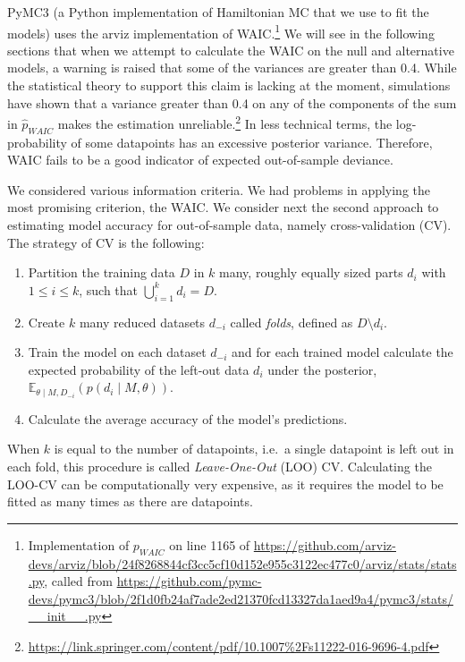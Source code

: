 \documentclass[a4paper,12pt,twoside]{article}
\begin{document}
PyMC3 (a Python implementation of Hamiltonian MC that we use to fit the models) uses the arviz implementation of WAIC.\footnote{Implementation of $p_{WAIC}$ on line 1165 of \url{https://github.com/arviz-devs/arviz/blob/24f8268844cf3cc5cf10d152e955c3122ec477c0/arviz/stats/stats.py}, called from \url{https://github.com/pymc-devs/pymc3/blob/2f1d0fb24af7ade2ed21370fcd13327da1aed9a4/pymc3/stats/__init__.py}} We will see in the following sections that when we attempt to calculate the WAIC on the null and alternative models, a warning is raised that some of the variances are greater than 0.4. While the statistical theory to support this claim is lacking at the moment, simulations have shown that a variance greater than 0.4 on any of the components of the sum in $\hat{p}_{WAIC}$ makes the estimation unreliable.\footnote{\url{https://link.springer.com/content/pdf/10.1007\%2Fs11222-016-9696-4.pdf}} In less technical terms, the log-probability of some datapoints has an excessive posterior variance. Therefore, WAIC fails to be a good indicator of expected out-of-sample deviance.

We considered various information criteria. We had problems in applying the most promising criterion, the WAIC. We consider next the second approach to estimating model accuracy for out-of-sample data, namely cross-validation (CV). The strategy of CV is the following:
\begin{enumerate}
\item Partition the training data $D$ in $k$ many, roughly equally sized parts $ d_i $ with $1 \leq i \leq k$, such that $\bigcup_{i=1}^{k} d_i = D$.
\item Create $k$ many reduced datasets $d_{-i}$ called \textit{folds}, defined as $D \setminus d_i$.
\item Train the model on each dataset $d_{-i}$ and for each trained model calculate the expected probability of the left-out data $d_i$ under the posterior, $\mathbb{E}_{\theta \mid M, D_{-i}}(p(d_i \mid M, \theta))$.
\item Calculate the average accuracy of the model's predictions.
\end{enumerate}
When $k$ is equal to the number of datapoints, i.e.\ a single datapoint is left out in each fold, this procedure is called \textit{Leave-One-Out} (LOO) CV. Calculating the LOO-CV can be computationally very expensive, as it requires the model to be fitted as many times as there are datapoints. 
\end{document}
